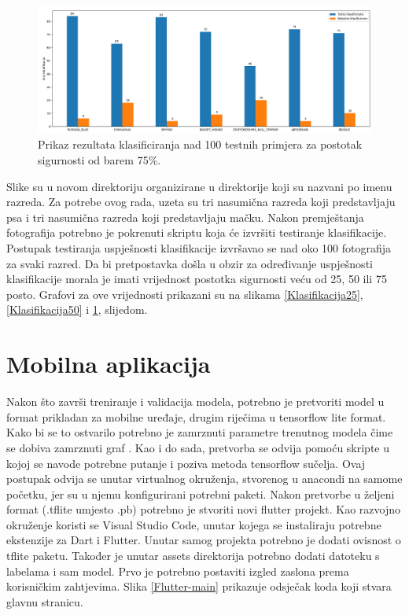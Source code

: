 \begin{figure}[htb]
    \centering
    \includegraphics[width=14cm]{img/Klas75.png}
    \caption{Prikaz rezultata klasificiranja nad 100 testnih primjera za postotak sigurnosti od barem 75\%.}
    \label{Klasifikacija75}
\end{figure}

Slike su u novom direktoriju organizirane u direktorije koji su nazvani po imenu razreda. 
Za potrebe ovog rada, uzeta su tri nasumična razreda koji predstavljaju psa i tri nasumična razreda koji predstavljaju mačku. Nakon premještanja fotografija potrebno je pokrenuti skriptu koja će izvršiti testiranje
klasifikacije. Postupak testiranja uspješnosti klasifikacije izvršavao se nad oko 100 fotografija za svaki razred. Da bi pretpostavka došla u obzir za određivanje uspješnosti klasifikacije morala je imati 
vrijednost postotka sigurnosti veću od 25, 50 ili 75 posto. Grafovi za ove vrijednosti prikazani su na slikama \ref{Klasifikacija25}, \ref{Klasifikacija50} i \ref{Klasifikacija75}, slijedom.



\section{Mobilna aplikacija}
Nakon što završi treniranje i validacija modela, potrebno je pretvoriti model u format prikladan za mobilne uređaje, drugim riječima u tensorflow lite format. Kako bi se to ostvarilo potrebno je 
zamrznuti parametre trenutnog modela čime se dobiva zamrznuti graf . Kao i do sada, pretvorba se odvija pomoću skripte u kojoj se navode potrebne putanje i poziva 
metoda tensorflow sučelja. Ovaj postupak odvija se unutar virtualnog okruženja, stvorenog u anacondi na samome početku, jer su u njemu konfigurirani potrebni paketi. Nakon pretvorbe u željeni format (.tflite umjesto .pb) potrebno 
je stvoriti novi flutter projekt. Kao razvojno okruženje koristi se Visual Studio Code, unutar kojega se instaliraju potrebne ekstenzije za Dart i Flutter. 
Unutar samog projekta potrebno je dodati ovisnost  o tflite paketu. Također je unutar assets direktorija potrebno dodati datoteku s labelama i sam model.\newline
Prvo je potrebno postaviti izgled zaslona prema korisničkim zahtjevima. Slika \ref{Flutter-main} prikazuje odsječak koda koji stvara glavnu stranicu.


